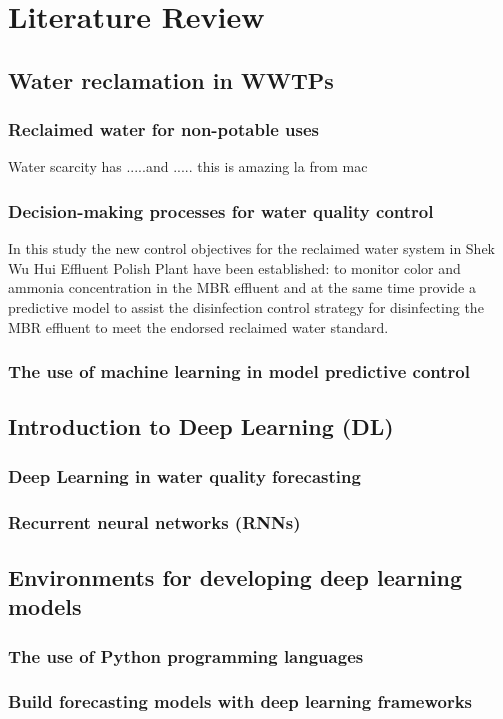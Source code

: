 \chapter{Literature Review}

\section{Water reclamation in WWTPs}
\subsection{Reclaimed water for non-potable uses}

Water scarcity has .....and ..... this is amazing la from mac

\subsection{Decision-making processes for water quality control}

In this study the new control objectives for the reclaimed water system in 
Shek Wu Hui Effluent Polish Plant have been established: to monitor color 
and ammonia concentration in the MBR effluent and at the same time provide 
a predictive model to assist the disinfection control strategy for disinfecting 
the MBR effluent to meet the endorsed reclaimed water standard.


\subsection{The use of machine learning in model predictive control}


\section{Introduction to Deep Learning (DL)}
\subsection{Deep Learning in water quality forecasting}
\subsection{Recurrent neural networks (RNNs)}

\section{Environments for developing deep learning models}
\subsection{The use of Python programming languages}
\subsection{Build forecasting models with deep learning frameworks}

